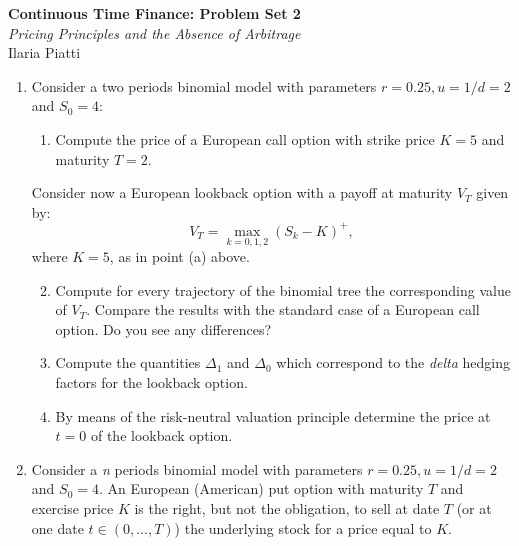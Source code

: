 \documentclass[11pt,a4,table]{article}
\begin{document}
\vspace*{-0.7in}

\begin{center}
 \textbf{Continuous Time Finance: Problem Set 2} \\
\textit{Pricing Principles and the Absence of Arbitrage} \\
Ilaria Piatti \\
\end{center} 


\begin{enumerate}
    \item Consider a two periods binomial model with parameters $r=0.25, u=1/d=2$ and $S_0=4$:
    
    \begin{enumerate}
        \item Compute the price of a European call option with strike price $K=5$ and maturity $T=2$.
    \end{enumerate}
    Consider now a European lookback option with a payoff at maturity $V_T$ given by:
    \begin{equation*}
        V_T=\max_{k=0,1,2}(S_k-K)^+,
    \end{equation*}
    where $K=5$, as in point (a) above.
    
    \begin{enumerate}
        \setcounter{enumii}{1}
    
        \item Compute for every trajectory of the binomial tree the corresponding value of $V_T$. Compare the results with the standard case of a European call option. Do you see any differences?
    
        \item Compute the quantities $\Delta_1$ and $\Delta_0$ which correspond to the \textit{delta} hedging factors for the lookback option.
        
        \item By means of the risk-neutral valuation principle determine the price at $t=0$ of the lookback option.
    \end{enumerate}
    
    
    \item Consider a \textit{n} periods binomial model with parameters $r=0.25, u=1/d=2$ and $S_0=4$. An European (American) put option with maturity $T$ and exercise price $K$ is the right, but not the obligation, to sell at date $T$ (or at one date $t\in(0,...,T)$) the underlying stock for a price equal to $K$.
    

\end{enumerate}
\end{document}
